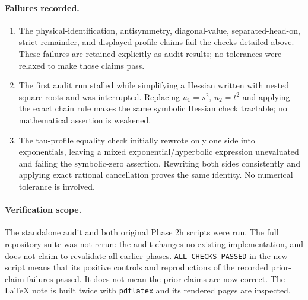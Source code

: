 \documentclass[11pt,a4paper]{article}
\begin{document}
\paragraph{Failures recorded.}
\begin{enumerate}
\item The physical-identification, antisymmetry, diagonal-value,
separated-head-on, strict-remainder, and displayed-profile claims fail the
checks detailed above. These failures are retained explicitly as audit
results; no tolerances were relaxed to make those claims pass.
\item The first audit run stalled while simplifying a Hessian written with
nested square roots and was interrupted. Replacing $u_1=s^2$, $u_2=t^2$
and applying the exact chain rule makes the same symbolic Hessian check
tractable; no mathematical assertion is weakened.
\item The tau-profile equality check initially rewrote only one side into
exponentials, leaving a mixed exponential/hyperbolic expression unevaluated
and failing the symbolic-zero assertion. Rewriting both sides consistently
and applying exact rational cancellation proves the same identity. No
numerical tolerance is involved.
\end{enumerate}

\paragraph{Verification scope.}
The standalone audit and both original Phase 2h scripts were run. The
full repository suite was not rerun: the audit changes no existing
implementation, and does not claim to revalidate all earlier phases.
\texttt{ALL CHECKS PASSED} in the new script means that its positive controls
and reproductions of the recorded prior-claim failures passed. It does
not mean the prior claims are now correct. The LaTeX note is built twice
with \texttt{pdflatex} and its rendered pages are inspected.
\end{document}
